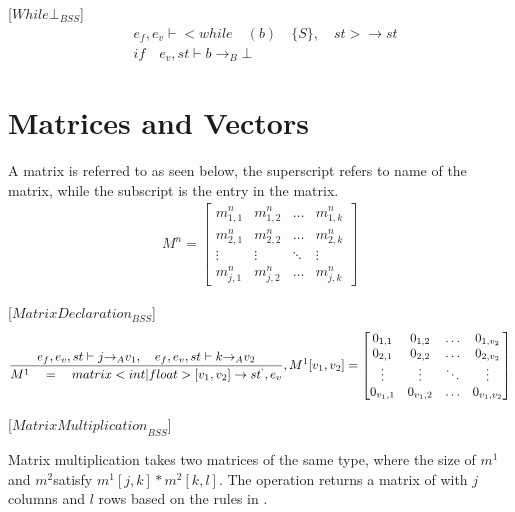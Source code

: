 [${While\bot}_{BSS}$]
\begin{align*}
	&{ e }_{ f },{ e }_{ v }\vdash <while\quad (b)\quad \{S\},\quad st>\rightarrow st\\
	&if\quad { e }_{ v },st\vdash b{ \rightarrow  }_{ B }\bot
\end{align*}

\section*{Matrices and Vectors}
A matrix is referred to as seen below, the superscript refers to name of the matrix, while the subscript is the entry in the matrix.
\begin{align*}
	M^{n}= \begin{bmatrix} { { m }_{ 1,1 }^{ n } } & { { m }_{ 1,2 }^{ n } } & \dots  & { m }_{ 1,k }^{ n } \\
{ { m }_{ 2,1 }^{ n } }  &  { { m }_{ 2,2 }^{ n } } & \dots & { m }_{ 2,k }^{ n }
\\ \vdots  & \vdots & \ddots  & \vdots \\
 { m }_{ j,1 }^{ n } & { m }_{ j,2 }^{ n } & \dots & { m }_{ j,k }^{ n } \end{bmatrix}
\end{align*}

[${MatrixDeclaration}_{BSS}$]
\begin{equation}
	\frac { { e }_{ f },{ e }_{ v },st\vdash j{ \rightarrow  }_{ A }{ v }_{ 1 },\quad { e }_{ f },{ e }_{ v },st\vdash k{ \rightarrow  }_{ A }{ v }_{ 2 } }{ { M }^{ 1 }\quad =\quad matrix<int|float>[{ v }_{ 1 },{ v }_{ 2 }]\rightarrow { st }^{ ` },{ e }_{ v } } ,{ M }^{ 1 }[{ v }_{ 1 },{ v }_{ 2 }]=\begin{bmatrix} { { 0 }_{ 1,1 } } & 0_{ 1,2 } & \dots  & { 0 }_{ { 1,{ v }_{ 2 } } } \\ 0_{ 2,1 } & 0_{ 2,2 } & \dots  & 0_{ 2,v_{ 2 } } \\ \vdots  & \vdots  & \ddots  & \vdots  \\ { 0 }_{ { v }_{ 1 },1 } & 0_{ v_{ 1 },2 } & \dots  & { 0 }_{ { v }_{ 1 },{ v }_{ 2 } } \end{bmatrix}
\end{equation}




[${MatrixMultiplication}_{BSS}$]

Matrix multiplication takes two matrices of the same type, where the size of $m^{1}$ and $m^{2}$satisfy $m^{1}[j,k]*m^{2}[k,l]$.
The operation returns a matrix of with $j$ columns and $l$ rows based on the rules in .


